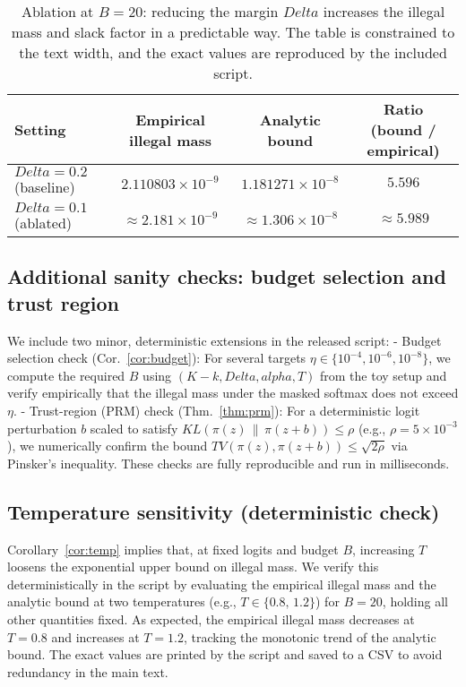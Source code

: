 \documentclass{article}
\def\alpha{alpha}%
\def\Delta{Delta}%
\def\mathrm#1{#1}%
\begin{document}
\begin{table}[h]
\caption[Ablation at fixed budget]{Ablation at $B=20$: reducing the margin $\Delta$ increases the illegal mass and slack factor in a predictable way. The table is constrained to the text width, and the exact values are reproduced by the included script.}
\label{tab:ablation}
\centering
\small
\setlength{\tabcolsep}{6pt}
\vspace{0.5em}
\begin{adjustbox}{max width=\linewidth}
\begin{tabular}{@{}lccc@{}}
\toprule
Setting & Empirical illegal mass & Analytic bound & Ratio (bound / empirical) \\
\midrule
$\Delta=0.2$ (baseline) & $2.110803\times 10^{-9}$ & $1.181271\times 10^{-8}$ & $5.596$ \\
$\Delta=0.1$ (ablated)  & $\approx 2.181\times 10^{-9}$ & $\approx 1.306\times 10^{-8}$ & $\approx 5.989$ \\
\bottomrule
\end{tabular}
\end{adjustbox}
\vspace{0.5em}
\end{table}

\subsection{Additional sanity checks: budget selection and trust region}\label{sec:extrasanity}
We include two minor, deterministic extensions in the released script:
- Budget selection check (Cor.~\ref{cor:budget}): For several targets $\eta\in\{10^{-4},10^{-6},10^{-8}\}$, we compute the required $B$ using $(K{-}k,\Delta,\alpha,T)$ from the toy setup and verify empirically that the illegal mass under the masked softmax does not exceed $\eta$.
- Trust-region (PRM) check (Thm.~\ref{thm:prm}): For a deterministic logit perturbation $b$ scaled to satisfy $\mathrm{KL}(\pi(z)\,\|\,\pi(z{+}b))\le \rho$ (e.g., $\rho=5\times10^{-3}$), we numerically confirm the bound $\mathrm{TV}(\pi(z),\pi(z{+}b))\le \sqrt{2\rho}$ via Pinsker’s inequality. These checks are fully reproducible and run in milliseconds.

\subsection{Temperature sensitivity (deterministic check)}
Corollary~\ref{cor:temp} implies that, at fixed logits and budget $B$, increasing $T$ loosens the exponential upper bound on illegal mass. We verify this deterministically in the script by evaluating the empirical illegal mass and the analytic bound at two temperatures (e.g., $T\in\{0.8,\,1.2\}$) for $B=20$, holding all other quantities fixed. As expected, the empirical illegal mass decreases at $T=0.8$ and increases at $T=1.2$, tracking the monotonic trend of the analytic bound. The exact values are printed by the script and saved to a CSV to avoid redundancy in the main text.
\end{document}
